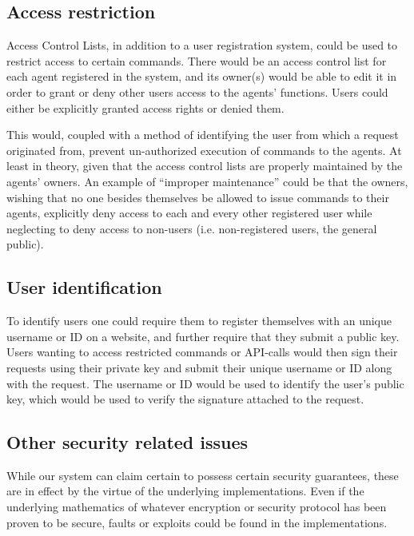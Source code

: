 \subsection{Access restriction}
Access Control Lists, in addition to a user registration system, could be used to restrict access to certain commands.
There would be an access control list for each agent registered in the system, and its owner(s) would be able to edit it in order to grant or deny other users access to the agents' functions.
Users could either be explicitly granted access rights or denied them.

This would, coupled with a method of identifying the user from which a request originated from, prevent un-authorized execution of commands to the agents.
At least in theory, given that the access control lists are properly maintained by the agents' owners.
An example of ``improper maintenance'' could be that the owners, wishing that no one besides themselves be allowed to issue commands to their agents, explicitly deny access to each and every other registered user while neglecting to deny access to non-users (i.e. non-registered users, the general public).


\subsection{User identification}
To identify users one could require them to register themselves with an unique username or ID on a website, and further require that they submit a public key.
Users wanting to access restricted commands or API-calls would then sign their requests using their private key and submit their unique username or ID along with the request.
The username or ID would be used to identify the user's public key, which would be used to verify the signature attached to the request.



\subsection{Other security related issues}
While our system can claim certain to possess certain security guarantees, these are in effect by the virtue of the underlying implementations.
Even if the underlying mathematics of whatever encryption or security protocol has been proven to be secure, faults or exploits could be found in the implementations.

